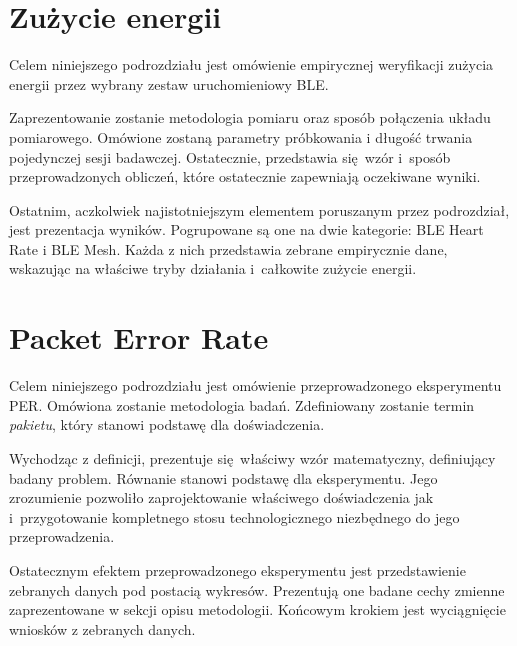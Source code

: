 \section{Zużycie energii}\label{experiment:energy-consumption}
Celem niniejszego podrozdziału jest omówienie empirycznej weryfikacji
zużycia energii przez wybrany zestaw uruchomieniowy \gls{BLE}.

Zaprezentowanie zostanie metodologia pomiaru oraz sposób połączenia
układu pomiarowego. Omówione zostaną parametry próbkowania i długość trwania
pojedynczej sesji badawczej. Ostatecznie, przedstawia się wzór i~sposób
przeprowadzonych obliczeń, które ostatecznie zapewniają oczekiwane wyniki.

Ostatnim, aczkolwiek najistotniejszym elementem poruszanym przez podrozdział,
jest prezentacja wyników. Pogrupowane są one na dwie kategorie: BLE Heart Rate
i BLE Mesh. Każda z nich przedstawia zebrane empirycznie dane, wskazując
na właściwe tryby działania i~całkowite zużycie energii.



\section{Packet Error Rate}\label{experiment:per}

Celem niniejszego podrozdziału jest omówienie przeprowadzonego eksperymentu \gls{PER}. Omówiona zostanie
metodologia badań. Zdefiniowany zostanie termin \textit{pakietu}, który stanowi podstawę dla
doświadczenia.

Wychodząc z definicji, prezentuje się właściwy wzór matematyczny, definiujący badany problem. Równanie
stanowi podstawę dla eksperymentu. Jego zrozumienie pozwoliło zaprojektowanie właściwego doświadczenia
jak i~przygotowanie kompletnego stosu technologicznego niezbędnego do jego przeprowadzenia.

Ostatecznym efektem przeprowadzonego eksperymentu jest przedstawienie zebranych danych pod postacią
wykresów. Prezentują one badane cechy zmienne zaprezentowane w sekcji opisu metodologii. Końcowym
krokiem jest wyciągnięcie wniosków z zebranych danych.
 

